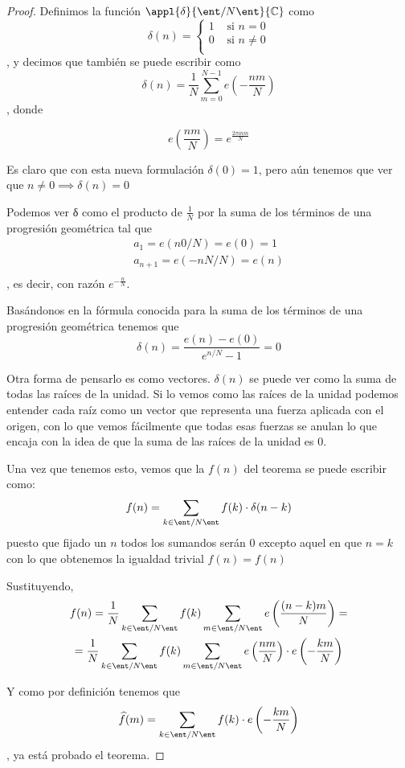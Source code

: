 \begin{proof}
	Definimos la función $\appl{\delta}{\ent/N\ent}{\mathbb{C}}$ como
	\[ \delta (n) = \begin{cases}
	1 &\text{ si } n=0\\
	0 &\text{ si } n\neq 0 \\
	\end{cases} \], y decimos que también se puede escribir como \[ \delta (n) = \frac{1}{N} \sum_{m = 0}^{N-1} e\left(-\frac{nm}{N}\right) \], donde

	\[e\left(\frac{nm}{N}\right) = e^{\frac{2\pi inm}{N}}\]

	Es claro que con esta nueva formulación $\delta(0) = 1$, pero aún tenemos que ver que $n\neq 0 \implies \delta (n) = 0$

	Podemos ver δ como el producto de $\frac{1}{N}$ por la suma de los términos de una progresión geométrica tal que
	\begin{gather*}
	a_1 = e(n0/N)=e(0)=1 \\
	a_{n+1} = e(-nN/N)=e(n) \\
	\end{gather*}, es decir, con razón $e^{-\frac{n}{N}}$.

	Basándonos en la fórmula conocida para la suma de los términos de una progresión geométrica tenemos que \[ \delta (n) =\frac{e(n) - e(0)}{e^{n/N} - 1} = 0 \]

	Otra forma de pensarlo es como vectores. $\delta(n)$ se puede ver como la suma de todas las raíces de la unidad. Si lo vemos como las raíces de la unidad podemos entender cada raíz como un vector que representa una fuerza aplicada con el origen, con lo que vemos fácilmente que todas esas fuerzas se anulan lo que encaja con la idea de que la suma de las raíces de la unidad es 0.


	Una vez que tenemos esto, vemos que la $f(n)$ del teorema se puede escribir como:
	$$f(n) = \sum_{k\in \ent/N\ent} f(k) \cdot \delta(n-k)$$
	puesto que fijado un $n$ todos los sumandos serán 0 excepto aquel en que $n=k$ con lo que obtenemos la igualdad trivial $f(n)=f(n)$

	Sustituyendo, \begin{multline*}
	f(n) =\frac{1}{N} \sum_{k\in \ent/N\ent} f(k)  \sum_{m \in \ent/N\ent} e\left(\frac{(n-k)m}{N}\right) = \\
	= \frac{1}{N} \sum_{k\in \ent/N\ent} f(k)  \sum_{m \in \ent/N\ent} e\left(\frac{nm}{N}\right) \cdot e\left(- \frac{km}{N}\right)
	\end{multline*}

	Y como por definición tenemos que
	\[ \widehat{f}(m) = \sum_{k\in \ent/N\ent} f(k) \cdot e\left(- \frac{km}{N}\right) \]
	, ya está probado el teorema.
\end{proof}
